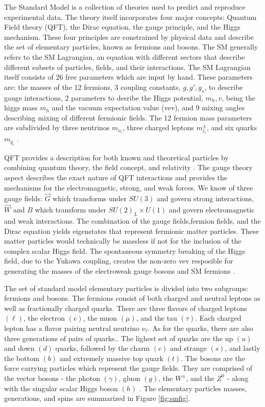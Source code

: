 The Standard Model is a collection of theories used to predict and reproduce experimental data. The theory itself incorporates four major concepts: Quantum Field theory (QFT), the Dirac equation, the gauge principle, and the Higgs mechanism. These four principles are constrained by physical data and describe the set of elementary particles, known as fermions and bosons. The SM generally refers to the SM Lagrangian, an equation with different sectors that describe different subsets of particles, fields, and their interactions. The SM Lagrangian itself consists of 26 free parameters which are input by hand. These parameters are: the masses of the 12 fermions, 3 coupling constants, $g, g', g_s$, to describe gauge interactions,  2 parameters to desribe the Higgs potential, $m_h, v$, being the higgs mass $m_h$ and the vacuum expectation value (vev), and 9 mixing angles describing mixing of different fermionic fields. The 12 fermion mass parameters are subdivided by three neutrinos $m_{\nu_i}$, three charged leptons $m_{\ell_i}^\pm$, and six quarks $m_{q_i}$ \cite{Thomson:2013zua}.

QFT provides a description for both known and theoretical particles by combining quantum theory, the field concept, and relativity \cite{Peskin:1995ev}. The gauge theory aspect describes the exact nature of QFT interactions and provides the mechanisms for the electromagnetic, strong, and weak forces.  We know of three gauge fields:  $\vec{G}$ which transforms under $SU(3)$ and govern strong interactions, $\vec{W}$ and $B$ which transform under $SU(2)_L \times U(1)$ and govern electromagnetic and weak interactions. The combination of the gauge fields,fermion fields, and the Dirac equation yields eigenstates that represent fermionic matter particles. These matter particles would technically be massless if not for the inclusion of the complex scalar Higgs field.  The spontaneous symmetry breaking of the Higgs field, due to the Yukawa coupling, creates the non-zero vev resposible for generating the masses of the electroweak gauge bosons and SM fermions \cite{Higgs:1966ev}\cite{Bernardi:2008zz}.

The set of standard model elementary particles is divided into two subgroups: fermions and bosons.  The fermions consist of both charged and neutral leptons as well as fractionally charged quarks. There are three flavors of charged leptons $(\ell)$, the electron $(e)$, the muon $(\mu)$, and the tau $(\tau)$. Each charged lepton has a flavor pairing neutral neutrino $\nu_\ell$.  As for the quarks, there are also three generations of pairs of quarks.. The lighest set of quarks are the up $(u)$ and down $(d)$ quarks, followed by the charm $(c)$ and strange $(s)$, and lastly the bottom $(b)$ and extremely massive top quark $(t)$.  The bosons are the force carrying particles which represent the gauge fields. They are comprised of the vector bosons - the photon $(\gamma)$, gluon $(g)$, the $W^\pm$, and the $Z^0$ - along with the singular scalar Higgs boson $(h)$ \cite{ParticleDataGroup:2020ssz}. The elementary particles masses, generations, and spins are summarized in Figure \ref{fig:smfig}.


